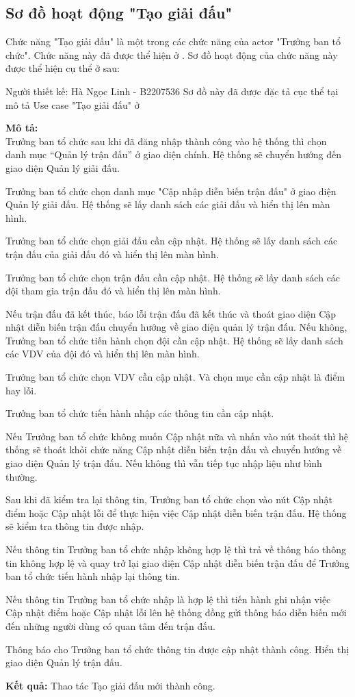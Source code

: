 \subsection{Sơ đồ hoạt động "Tạo giải đấu"}
\setcounter{figure}{0}

Chức năng "Tạo giải đấu" là một trong các chức năng của actor "Trưởng ban tổ chức".
Chức năng này đã được thể hiện ở \myref{}.
Sơ đồ hoạt động của chức năng này được thể hiện cụ thể ở \myref{} sau:

Người thiết kế: Hà Ngọc Linh - B2207536
Sơ đồ này đã được đặc tả cục thể tại mô tả Use case "Tạo giải đấu" ở \myreftb{}

\noindent
\textbf{Mô tả:}\\
Trưởng ban tổ chức sau khi đã đăng nhập thành công vào hệ thống thì chọn danh mục “Quản lý trận đấu” ở giao diện chính. Hệ thống sẽ chuyển hướng đến giao diện Quản lý giải đấu. \par
Trưởng ban tổ chức chọn danh mục "Cập nhập diễn biến trận đấu" ở giao diện Quản lý giải đấu. Hệ thống sẽ lấy danh sách các giải đấu và hiển thị lên màn hình. \par
Trưởng ban tổ chức chọn giải đấu cần cập nhật. Hệ thống sẽ lấy danh sách các trận đấu của giải đấu đó và hiển thị lên màn hình. \par
Trưởng ban tổ chức chọn trận đấu cần cập nhật. Hệ thống sẽ lấy danh sách các đội tham gia trận đấu đó và hiển thị lên màn hình. \par
Nếu trận đấu đã kết thúc, báo lỗi trận đấu đã kết thúc và thoát giao diện Cập nhật diễn biến trận đấu chuyển hướng về giao diện quản lý trận đấu. Nếu không, Trưởng ban tổ chức tiến hành chọn đội cần cập nhật. Hệ thống sẽ lấy danh sách các VDV của đội đó và hiển thị lên màn hình. \par
Trưởng ban tổ chức chọn VDV cần cập nhật. Và chọn mục cần cập nhật là điểm hay lỗi. \par
Trưởng ban tổ chức tiến hành nhập các thông tin cần cập nhật. \par
Nếu Trưởng ban tổ chức không muốn Cập nhật nữa và nhấn vào nút thoát thì hệ thống sẽ thoát khỏi chức năng Cập nhật diễn biến trận đấu và chuyển hướng về giao diện Quản lý trận đấu. Nếu không thì vẫn tiếp tục nhập liệu như bình thường. \par
Sau khi đã kiểm tra lại thông tin, Trưởng ban tổ chức chọn vào nút Cập nhật điểm hoặc Cập nhật lỗi để thực hiện việc Cập nhật diễn biến trận đấu. Hệ thống sẽ kiểm tra thông tin được nhập. \par
Nếu thông tin Trưởng ban tổ chức nhập không hợp lệ thì trả về thông báo thông tin không hợp lệ và quay trở lại giao diện Cập nhật diễn biến trận đấu để Trưởng ban tổ chức tiến hành nhập lại thông tin. \par
Nếu thông tin Trưởng ban tổ chức nhập là hợp lệ thì tiến hành ghi nhận việc Cập nhật điểm hoặc Cập nhật lỗi lên hệ thống đồng gửi thông báo diễn biến mới đến những người dùng có quan tâm đến trận đấu. \par
Thông báo cho Trưởng ban tổ chức thông tin được cập nhật thành công. Hiển thị giao diện Quản lý trận đấu.

\noindent
\textbf{Kết quả:} Thao tác Tạo giải đấu mới thành công.


